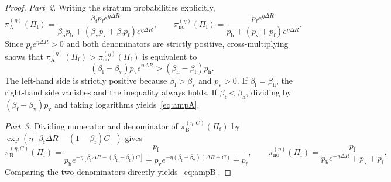\documentclass[11pt,a4paper]{article}
\begin{document}
\begin{proof}
\emph{Part~2.} Writing the stratum probabilities explicitly,
\[
  \pi_{\mathrm{A}}^{(\eta)}(\Pi_{\mathrm{f}})
  = \frac{\beta_{\mathrm{f}} p_{\mathrm{f}} e^{\eta \Delta R}}{\beta_{\mathrm{h}} p_{\mathrm{h}} + (\beta_{\mathrm{v}} p_{\mathrm{v}} + \beta_{\mathrm{f}} p_{\mathrm{f}}) e^{\eta \Delta R}},
  \qquad
  \pi_{\mathrm{no}}^{(\eta)}(\Pi_{\mathrm{f}})
  = \frac{p_{\mathrm{f}} e^{\eta \Delta R}}{p_{\mathrm{h}} + (p_{\mathrm{v}} + p_{\mathrm{f}}) e^{\eta \Delta R}}.
\]
Since $p_{\mathrm{f}} e^{\eta \Delta R} > 0$ and both denominators are strictly positive, cross-multiplying shows that $\pi_{\mathrm{A}}^{(\eta)}(\Pi_{\mathrm{f}}) > \pi_{\mathrm{no}}^{(\eta)}(\Pi_{\mathrm{f}})$ is equivalent to
\[
  (\beta_{\mathrm{f}} - \beta_{\mathrm{v}}) p_{\mathrm{v}} e^{\eta \Delta R} > (\beta_{\mathrm{h}} - \beta_{\mathrm{f}}) p_{\mathrm{h}}.
\]
The left-hand side is strictly positive because $\beta_{\mathrm{f}} > \beta_{\mathrm{v}}$ and $p_{\mathrm{v}} > 0$. If $\beta_{\mathrm{f}} = \beta_{\mathrm{h}}$, the right-hand side vanishes and the inequality always holds. If $\beta_{\mathrm{f}} < \beta_{\mathrm{h}}$, dividing by $(\beta_{\mathrm{f}} - \beta_{\mathrm{v}})p_{\mathrm{v}}$ and taking logarithms yields~\eqref{eq:ampA}.

\emph{Part~3.} Dividing numerator and denominator of $\pi_{\mathrm{B}}^{(\eta, C)}(\Pi_{\mathrm{f}})$ by $\exp(\eta[\beta_{\mathrm{f}}\Delta R - (1-\beta_{\mathrm{f}})C])$ gives
\[
  \pi_{\mathrm{B}}^{(\eta, C)}(\Pi_{\mathrm{f}})
  = \frac{p_{\mathrm{f}}}{p_{\mathrm{h}} e^{-\eta[\beta_{\mathrm{f}}\Delta R - (\beta_{\mathrm{h}}-\beta_{\mathrm{f}})C]} + p_{\mathrm{v}} e^{-\eta(\beta_{\mathrm{f}}-\beta_{\mathrm{v}})(\Delta R + C)} + p_{\mathrm{f}}},
  \qquad
  \pi_{\mathrm{no}}^{(\eta)}(\Pi_{\mathrm{f}})
  = \frac{p_{\mathrm{f}}}{p_{\mathrm{h}} e^{-\eta \Delta R} + p_{\mathrm{v}} + p_{\mathrm{f}}}.
\]
Comparing the two denominators directly yields~\eqref{eq:ampB}.


\end{proof}
\end{document}
